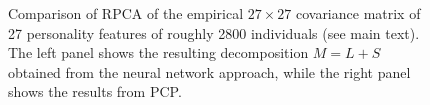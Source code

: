 \begin{figure}
	\caption{Comparison of RPCA of the empirical $27\times 27$ covariance matrix of 27 personality features of roughly 2800 individuals (see main text). The left panel shows the resulting decomposition $M=L+S$ obtained from the neural network approach, while the right panel shows the results from PCP.}
	\label{fig:comp_psych}
\end{figure}








